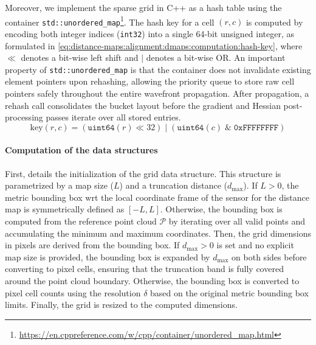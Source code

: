 Moreover, we implement the sparse grid in C++ as a hash table using the container
\texttt{std::unordered\_map}\footnote{\label{note:hash-table}\url{https://en.cppreference.com/w/cpp/container/unordered_map.html}}.
The hash key for a cell $(r,c)$ is computed by encoding both integer indices
(\texttt{int32}) into a single 64-bit unsigned integer, as formulated in
\eqref{eq:distance-maps:alignment:dmaps:computation:hash-key}, where
$\ll$ denotes a bit-wise left shift and $|$ denotes a bit-wise OR.
An important property of \texttt{std::unordered\_map} is that the container does
not invalidate existing element pointers upon rehashing, allowing the
priority queue to store raw cell pointers safely throughout the entire
wavefront propagation. After propagation, a rehash call consolidates
the bucket layout before the gradient and Hessian post-processing passes
iterate over all stored entries.
\begin{equation}
\label{eq:distance-maps:alignment:dmaps:computation:hash-key}
\mathrm{key}(r, c) =
\left(\texttt{uint64}(r) \ll 32\right)
\;\big|\;
\left(\texttt{uint64}(c) \;\&\; \texttt{0xFFFFFFFF}\right)
\end{equation}

\paragraph{Computation of the data structures}

First,  details the
initialization of the grid data structure.
This structure is parametrized by a map size ($L$) and a truncation distance
($d_{\max}$). If $L > 0$, the metric bounding box \gls{wrt} the local coordinate
frame of the sensor for the distance map is symmetrically defined as
$[-L, L]$. Otherwise, the bounding box is computed from
the reference point cloud $\mathcal{P}$ by iterating over all valid points and
accumulating the minimum and maximum coordinates.
Then, the grid dimensions in pixels are derived from the bounding box.
If $d_{\max} > 0$ is set and no explicit map size is
provided, the bounding box is expanded by $d_{\max}$ on both sides before
converting to pixel cells, ensuring that the truncation band is fully covered
around the point cloud boundary.
Otherwise, the bounding box is converted to pixel cell counts using
the resolution $\delta$ based on the original metric bounding box limits.
Finally, the grid is resized to the computed dimensions.



